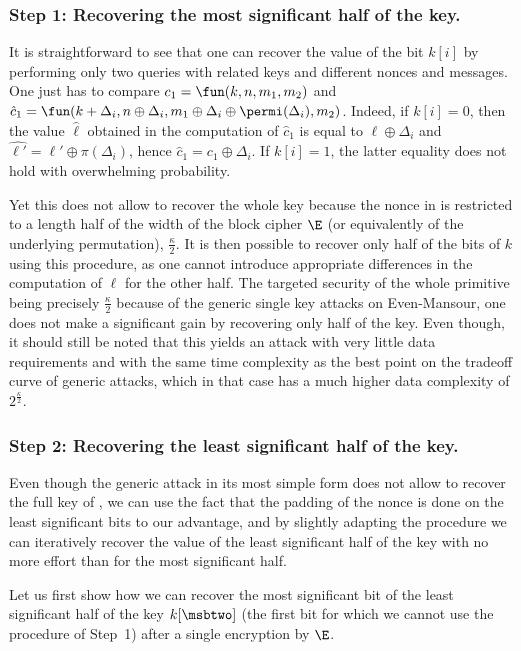 \subsubsection{Step 1: Recovering the most significant half of the key.}

It is straightforward to see that one can recover the value
of the bit $k[i]$ by performing only two queries with related keys
and different nonces and messages. One just has to compare
$c_1 = \fun(k, n, m_1, m_2)$ and
$\hat{c}_1 = \fun(k + \Delta_i,n \oplus \Delta_i,
m_1 \oplus \Delta_i \oplus \permi(\Delta_i), m_2)$. Indeed, if $k[i] = 0$,
then the value $\hat{\ell}$ obtained in the computation of $\hat{c}_1$ is equal to
$\ell \oplus \Delta_i$ and $\hat{\ell'} = \ell' \oplus \pi(\Delta_i)$, hence
$\hat{c}_1 = c_1 \oplus \Delta_i$. If $k[i] = 1$, the latter equality does not
hold with overwhelming probability.

Yet this does not allow to recover the whole key because the nonce in \proestotr is restricted to a length
half of the width of the block cipher $\E$ (or equivalently of the underlying \proest permutation),
\ie $\frac{\kappa}{2}$. It is then possible to recover only
half of the bits of $k$ using this procedure, as one cannot introduce appropriate differences in
the computation of $\ell$ for the other half. The targeted security of the
whole primitive being precisely $\frac{\kappa}{2}$ because of the generic single key
attacks on Even-Mansour,
one does not make a significant gain by recovering only half of the key.
Even though, it should still be noted that this yields an
attack with very little data requirements and with the same time complexity as the best
point on the tradeoff curve of generic attacks, which in that case has a much higher data complexity of
$2^\frac{\kappa}{2}$.


\subsubsection{Step 2: Recovering the least significant half of the key.}

Even though the generic attack in its most simple form does not allow to recover the full key
of \proestotr,
we can use the fact that the padding of the nonce is done on the least significant
bits to our advantage, and by slightly adapting the procedure we can iteratively recover the value
of the least significant half of the key with no more effort than for the most significant half.

Let us first show how we can recover the most significant bit of the least significant half of
the key $k[\msbtwo]$ (\ie the first bit for which we cannot use the procedure of Step~1)
after a single encryption by $\E$. 

